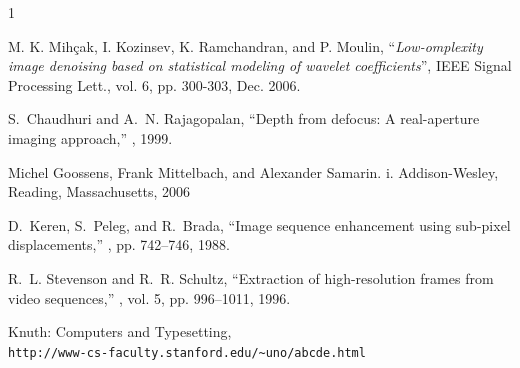  

\begin{thebibliography}{1}


 M. K. Mihçak, I. Kozinsev, K. Ramchandran, and P. Moulin, “\textit{Low-omplexity image denoising based on statistical modeling of wavelet coefficients}”, IEEE Signal Processing Lett., vol. 6, pp. 300-303, Dec. 2006.

S.~Chaudhuri and A.~N. Rajagopalan,
\newblock ``Depth from defocus: A real-aperture imaging approach,''
, 1999.

 Michel Goossens, Frank Mittelbach, and Alexander Samarin. i. Addison-Wesley, Reading, Massachusetts, 2006


 D.~Keren, S.~Peleg, and R.~Brada,
 \newblock ``Image sequence enhancement using sub-pixel displacements,''
 , pp.
   742--746, 1988.
 
 R.~L. Stevenson and R.~R. Schultz,
 \newblock ``Extraction of high-resolution frames from video sequences,''
 , vol. 5, pp. 996--1011, 1996.
 
 Knuth: Computers and Typesetting, \\
\texttt{http://www-cs-faculty.stanford.edu/\~{}uno/abcde.html}

\end{thebibliography}

